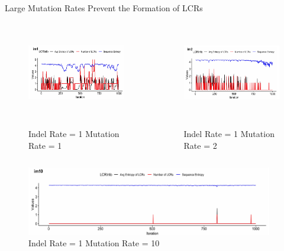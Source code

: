 \documentclass{beamer}
\begin{document}
	\begin{frame}{Large Mutation Rates Prevent the Formation of LCRs}
		\begin{columns}	
			\centering
			\begin{figure}
				\includegraphics[height=3cm, width=6cm]{ind_figures/im1} \\~\\
				\vspace{-0.5cm}\tiny\caption{\centering Indel Rate = 1 Mutation Rate = 1}
			\end{figure} \pause
			
			\centering
			\begin{figure}
				\includegraphics[height=3cm, width=6cm]{ind_figures/im2} \\~\\
				\vspace{-0.5cm}\tiny\caption{\centering Indel Rate = 1 Mutation Rate = 2}
			\end{figure} \pause
			
		\end{columns}
		
		\begin{figure}
			\vspace{-0.4cm}\includegraphics[height=3cm, width=\textwidth]{ind_figures/im10}
			\vspace{-0.7cm}\caption{\centering Indel Rate = 1 Mutation Rate = 10}
		\end{figure}
	\end{frame}
	
\end{document}
